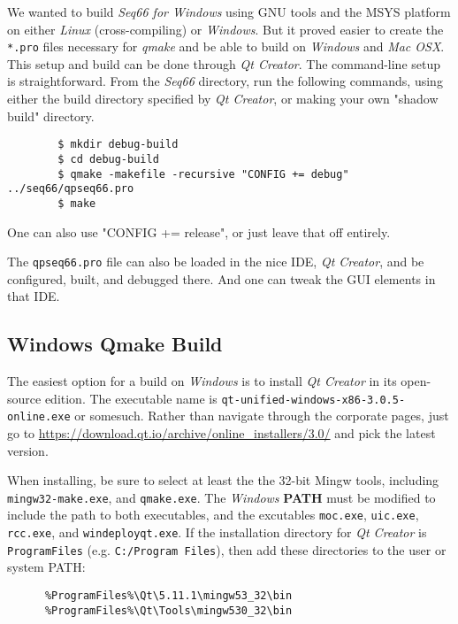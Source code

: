    We wanted to build \textsl{Seq66 for Windows} using GNU tools and the
   MSYS platform on either \textsl{Linux} (cross-compiling) or
   \textsl{Windows}.  But it proved easier to create the
   \texttt{*.pro} files necessary for \textsl{qmake} and be able to build
   on \textsl{Windows} and \textsl{Mac OSX}.
   This setup and build can be done through \textsl{Qt Creator}.
   The command-line setup is straightforward.
   From the \textsl{Seq66} directory, run the following
   commands, using either the build directory specified by \textsl{Qt Creator},
   or making your own "shadow build" directory.

   \begin{verbatim}
        $ mkdir debug-build
        $ cd debug-build
        $ qmake -makefile -recursive "CONFIG += debug" ../seq66/qpseq66.pro
        $ make
   \end{verbatim}

    One can also use "CONFIG += release", or just leave that off entirely.

    The \texttt{qpseq66.pro} file can also be loaded in the
    nice IDE, \textsl{Qt Creator}, and be configured, built, and debugged
    there.  And one can tweak the GUI elements in that IDE.

\subsection{Windows Qmake Build}
\label{subsec:build_qmake_windows}

   The easiest option for a build on \textsl{Windows} is to install 
   \textsl{Qt Creator} in its open-source edition.
   The executable name is
   \texttt{qt-unified-windows-x86-3.0.5-online.exe} or somesuch.
   Rather than navigate through the corporate pages, just go to
   \url{https://download.qt.io/archive/online_installers/3.0/} and
   pick the latest version.
   
   When installing, be sure to select at least the the 32-bit Mingw tools,
   including \texttt{mingw32-make.exe}, and
   \texttt{qmake.exe}.  The \textsl{Windows}
   \textbf{PATH} must be modified to
   include the path to both executables, and the excutables
   \texttt{moc.exe}, \texttt{uic.exe}, \texttt{rcc.exe}, and
   \texttt{windeployqt.exe}.
   If the installation directory for \textsl{Qt Creator} is
   \texttt{ProgramFiles} (e.g. \texttt{C:/Program Files}), then add
   these directories to the user or system PATH:

   \begin{verbatim}
      %ProgramFiles%\Qt\5.11.1\mingw53_32\bin
      %ProgramFiles%\Qt\Tools\mingw530_32\bin
   \end{verbatim}

